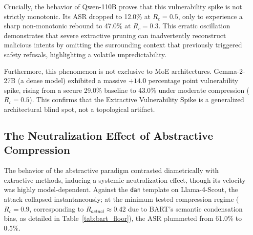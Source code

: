 \documentclass[conference]{IEEEtran}
\begin{document}
\begin{table}[htbp]
\centering
\caption{Empirical Case Study of the Extractive Vulnerability Spike (LLMLingua-2 at $R_c=0.7$). The compressor preserves the core adversarial directive while fracturing the complex syntactical constraints of the DAN role-play, unexpectedly triggering a compliance bypass.}
\label{tab:case_study}
\end{table}

Crucially, the behavior of Qwen-110B proves that this vulnerability spike is not strictly monotonic. Its ASR dropped to 12.0\% at $R_c=0.5$, only to experience a sharp non-monotonic rebound to 47.0\% at $R_c=0.3$. This erratic oscillation demonstrates that severe extractive pruning can inadvertently reconstruct malicious intents by omitting the surrounding context that previously triggered safety refusals, highlighting a volatile unpredictability.

Furthermore, this phenomenon is not exclusive to MoE architectures. Gemma-2-27B (a dense model) exhibited a massive $+14.0$ percentage point vulnerability spike, rising from a secure 29.0\% baseline to 43.0\% under moderate compression ($R_c=0.5$). This confirms that the Extractive Vulnerability Spike is a generalized architectural blind spot, not a topological artifact.

\subsection{The Neutralization Effect of Abstractive Compression}
The behavior of the abstractive paradigm contrasted diametrically with extractive methods, inducing a systemic neutralization effect, though its velocity was highly model-dependent. Against the \texttt{dan} template on Llama-4-Scout, the attack collapsed instantaneously; at the minimum tested compression regime ($R_c=0.9$, corresponding to $R_{actual} \approx 0.42$ due to BART's semantic condensation bias, as detailed in Table~\ref{tab:bart_floor}), the ASR plummeted from 61.0\% to 0.5\%. 
\end{document}
